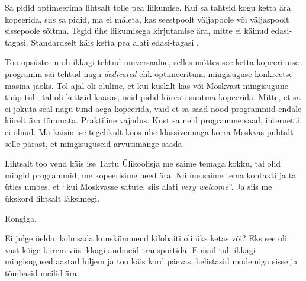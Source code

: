 
Sa pidid  optimeerima lihtsalt tolle pea liikumise. Kui sa tahtsid kogu ketta 
ära kopeerida, siis sa pidid, ma ei mäleta, kas seestpoolt väljapoole või 
väljaspoolt sissepoole sõitma. Tegid ühe liikumisega kirjutamise ära, 
mitte ei käinud edasi-tagasi. Standardselt käis ketta pea alati edasi-tagasi 
.


Too opsüsteem oli ikkagi  tehtud universaalne, selles mõttes see ketta 
kopeerimise programm sai tehtud nagu \emph{dedicated} ehk optimeerituna 
mingisuguse konkreetse masina jaoks. Tol ajal oli oluline, et kui kuskilt kas või 
Moskvast mingisugune tüüp tuli, tal oli kettaid kaasas, neid pidid 
kiiresti suutma kopeerida. Mitte, et sa ei jokuta seal nagu tund aega 
kopeerida, vaid et sa saad  nood programmid endale kiirelt ära tõmmata. 
Praktiline vajadus. Kust sa neid programme saad, internetti ei olnud. Ma käisin 
ise tegelikult koos ühe klassivennaga korra Moskvas puhtalt selle pärast, et 
mingisuguseid arvutimänge saada.


Lihtsalt too vend käis ise Tartu Ülikoolisja me saime temaga kokku, tal olid 
mingid programmid, me kopeerisime need ära. Nii me saime tema kontakti ja ta 
ütles umbes, et \enquote{kui Moskvasse satute, siis alati \emph{very welcome}}. 
Ja siis me ükskord lihtsalt läksimegi.


Rongiga. 


Ei julge öelda, kolmsada kuuskümmend kilobaiti oli üks ketas või? Eks see oli 
vast kõige kiirem viis ikkagi andmeid transportida. E-mail tuli ikkagi 
mingisugused aastad hiljem ja too käis  kord päevas, helistasid modemiga 
sisse ja tõmbasid meilid ära.

